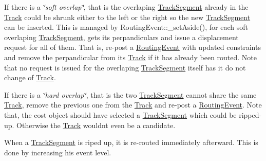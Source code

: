 \begin{DoxyEnumerate}
\begin{DoxyItemize}
If there is a {\itshape \char`\"{}soft overlap\char`\"{}}, that is the overlaping {\ttfamily \hyperlink{classKite_1_1TrackSegment}{Track\+Segment}} already in the {\ttfamily \hyperlink{classKite_1_1Track}{Track}} could be shrunk either to the left or the right so the new {\ttfamily \hyperlink{classKite_1_1TrackSegment}{Track\+Segment}} can be inserted. This is managed by {\ttfamily Routing\+Event\+::\+\_\+set\+Aside()}, for each soft overlaping {\ttfamily \hyperlink{classKite_1_1TrackSegment}{Track\+Segment}}, gets its perpandiculars and issue a displacement request for all of them. That is, re-\/post a {\ttfamily \hyperlink{classKite_1_1RoutingEvent}{Routing\+Event}} with updated constraints and remove the perpandicular from it\textquotesingle{}s \hyperlink{classKite_1_1Track}{Track} if it has already been routed. Note that no request is issued for the overlaping {\ttfamily \hyperlink{classKite_1_1TrackSegment}{Track\+Segment}} itself has it do not change of \hyperlink{classKite_1_1Track}{Track}.

If there is a {\itshape \char`\"{}hard overlap\char`\"{}}, that is the two {\ttfamily \hyperlink{classKite_1_1TrackSegment}{Track\+Segment}} cannot share the same {\ttfamily \hyperlink{classKite_1_1Track}{Track}}, remove the previous one from the {\ttfamily \hyperlink{classKite_1_1Track}{Track}} and re-\/post a {\ttfamily \hyperlink{classKite_1_1RoutingEvent}{Routing\+Event}}. Note that, the cost object should have selected a {\ttfamily \hyperlink{classKite_1_1TrackSegment}{Track\+Segment}} which could be ripped-\/up. Otherwise the {\ttfamily \hyperlink{classKite_1_1Track}{Track}} would\textquotesingle{}nt even be a candidate. 
\end{DoxyItemize}

When a \hyperlink{classKite_1_1TrackSegment}{Track\+Segment} is riped up, it is re-\/routed immediately afterward. This is done by increasing his event level. 
\end{DoxyEnumerate}